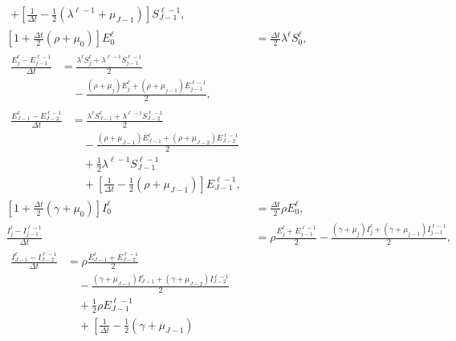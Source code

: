 \documentclass{jpmarticle}
\let\subequationsorig\subequations%
\let\endsubequationsorig\endsubequations%
\renewenvironment{subequations}{
  \subequationsorig
  \renewcommand{\theequation}{\theparentequation.\arabic{equation}}
}{
  \endsubequationsorig
}
\begin{document}
\begin{subequations}
\begin{align}
\begin{split}
      + \left[
        \frac{1}{\Delta t} - \frac{1}{2} (\lambda^{\ell - 1} + \mu_{J - 1})
      \right] S_{J - 1}^{\ell - 1},
    \end{split}
    \\
    \left[1 + \frac{\Delta t}{2} (\rho + \mu_0)\right] E_0^{\ell}
    &= \frac{\Delta t}{2} \lambda^{\ell} S_0^{\ell},
    \\
    \begin{split}
      \frac{E_j^{\ell} - E_{j - 1}^{\ell - 1}}{\Delta t} &=
      \frac{\lambda^{\ell} S_j^{\ell} + \lambda^{\ell - 1} S_{j - 1}^{\ell - 1}}{2}
      \\ & \quad {}
      - \frac{(\rho + \mu_j) E_j^{\ell}
        + (\rho + \mu_{j - 1}) E_{j - 1}^{\ell - 1}}{2},
    \end{split}
    \\
    \begin{split}
      \frac{E_{J - 1}^{\ell} - E_{J - 2}^{\ell - 1}}{\Delta t} &=
      \frac{\lambda^{\ell} S_{J - 1}^{\ell}
        + \lambda^{\ell - 1} S_{J - 2}^{\ell - 1}}{2}
      \\ & \quad {}
      - \frac{(\rho + \mu_{J - 1}) E_{J - 1}^{\ell}
        + (\rho + \mu_{J - 2}) E_{J - 2}^{\ell - 1}}{2}
      \\ & \quad {}
      + \frac{1}{2} \lambda^{\ell - 1} S_{J - 1}^{\ell - 1}
      \\ & \quad {}
      + \left[
        \frac{1}{\Delta t} - \frac{1}{2} (\rho + \mu_{J - 1})
      \right] E_{J - 1}^{\ell - 1},
    \end{split}
    \\
    \left[1 + \frac{\Delta t}{2} (\gamma + \mu_0)\right] I_0^{\ell}
    &= \frac{\Delta t}{2} \rho E_0^{\ell},
    \\
    \frac{I_j^{\ell} - I_{j - 1}^{\ell - 1}}{\Delta t} &=
    \rho \frac{E_j^{\ell} + E_{j - 1}^{\ell - 1}}{2}
    - \frac{(\gamma + \mu_j) I_j^{\ell}
      + (\gamma + \mu_{j - 1}) I_{j - 1}^{\ell - 1}}{2},
    \\
    \begin{split}
      \frac{I_{J - 1}^{\ell} - I_{J - 2}^{\ell - 1}}{\Delta t} &=
      \rho \frac{E_{J - 1}^{\ell} + E_{J - 2}^{\ell - 1}}{2}
      \\ & \quad {}
      - \frac{(\gamma + \mu_{J - 1}) I_{J - 1}^{\ell}
        + (\gamma + \mu_{J - 2}) I_{J - 2}^{\ell - 1}}{2}
      \\ & \quad {}
      + \frac{1}{2} \rho E_{J - 1}^{\ell - 1}
      \\ & \quad {}
      + \left[
        \frac{1}{\Delta t} - \frac{1}{2} (\gamma + \mu_{J - 1})

\end{split}
\end{align}
\end{subequations}
\end{document}

